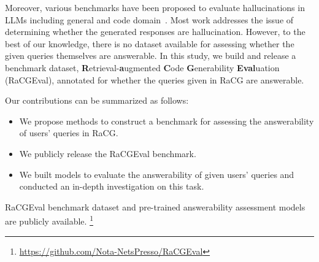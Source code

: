 Moreover, various benchmarks have been proposed to evaluate hallucinations in LLMs including general \cite{li2023halueval} and code domain~\cite{tian2024codehalu}. Most work addresses the issue of determining whether the generated responses are hallucination. However, to the best of our knowledge, there is no dataset available for assessing whether the given queries themselves are answerable. In this study, we build and release a benchmark dataset, \textbf{R}etrieval-\textbf{a}ugmented \textbf{C}ode \textbf{G}enerability \textbf{Eval}uation (RaCGEval), annotated for whether the queries given in RaCG are answerable.

Our contributions can be summarized as follows:
\begin{itemize}
  \item We propose methods to construct a benchmark for assessing the answerability of users' queries in RaCG. 
  \item We publicly release the RaCGEval benchmark. 
  \item We built models to evaluate the answerability of given users' queries and conducted an in-depth investigation on this task.  
\end{itemize}
RaCGEval benchmark dataset and pre-trained answerability assessment models are publicly available. \footnote{ \url{https://github.com/Nota-NetsPresso/RaCGEval}}